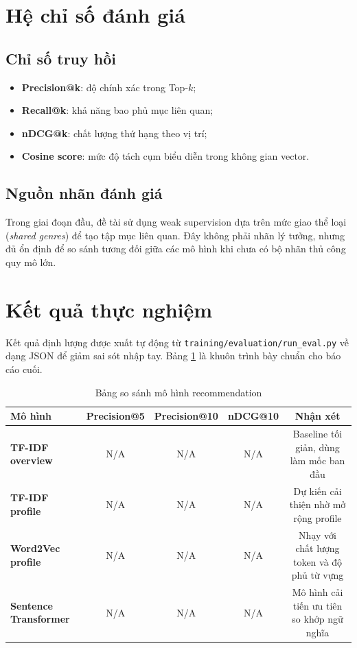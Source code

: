 \section{Hệ chỉ số đánh giá}
\subsection{Chỉ số truy hồi}
\begin{itemize}
    \item \textbf{Precision@k}: độ chính xác trong Top-$k$;
    \item \textbf{Recall@k}: khả năng bao phủ mục liên quan;
    \item \textbf{nDCG@k}: chất lượng thứ hạng theo vị trí;
    \item \textbf{Cosine score}: mức độ tách cụm biểu diễn trong không gian vector.
\end{itemize}

\subsection{Nguồn nhãn đánh giá}
Trong giai đoạn đầu, đề tài sử dụng weak supervision dựa trên mức giao thể loại (\textit{shared genres}) để tạo tập mục liên quan. Đây không phải nhãn lý tưởng, nhưng đủ ổn định để so sánh tương đối giữa các mô hình khi chưa có bộ nhãn thủ công quy mô lớn.

\section{Kết quả thực nghiệm}
Kết quả định lượng được xuất tự động từ \texttt{training/evaluation/run\_eval.py} về dạng JSON để giảm sai sót nhập tay. Bảng \ref{tab:model_comparison} là khuôn trình bày chuẩn cho báo cáo cuối.

\begin{table}[H]
\centering
\caption{Bảng so sánh mô hình recommendation}
\label{tab:model_comparison}
\begin{tabularx}{\textwidth}{>{\bfseries}lcccc}
\toprule
Mô hình & Precision@5 & Precision@10 & nDCG@10 & Nhận xét \\
\midrule
TF-IDF overview & N/A & N/A & N/A & Baseline tối giản, dùng làm mốc ban đầu \\
TF-IDF profile & N/A & N/A & N/A & Dự kiến cải thiện nhờ mở rộng profile \\
Word2Vec profile & N/A & N/A & N/A & Nhạy với chất lượng token và độ phủ từ vựng \\
Sentence Transformer & N/A & N/A & N/A & Mô hình cải tiến ưu tiên so khớp ngữ nghĩa \\
\bottomrule
\end{tabularx}
\end{table}

